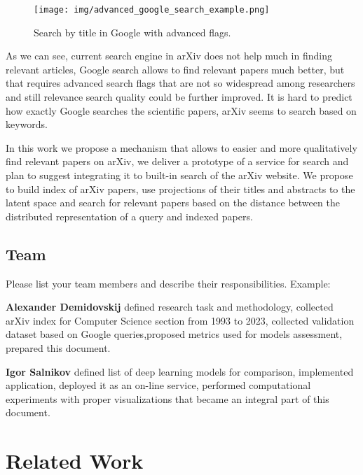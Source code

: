 \documentclass{article}
\begin{document}
    \begin{figure}[!tbh]
        \centering
        \texttt{[image: img/advanced\_google\_search\_example.png]}
        \caption{Search by title in Google with advanced flags.}
        \label{fig:advanced-google-search}
    \end{figure}
    
    As we can see, current search engine in arXiv does not help much in finding relevant articles, Google search allows to find relevant papers much better, but that requires advanced search flags that are not so widespread among researchers and still relevance search quality could be further improved. It is hard to predict how exactly Google searches the scientific papers, arXiv seems to search based on keywords.
    
    In this work we propose a mechanism that allows to easier and more qualitatively find relevant papers on arXiv, we deliver a prototype of a service for search and plan to suggest integrating it to built-in search of the arXiv website. We propose to build index of arXiv papers, use projections of their titles and abstracts to the latent space and search for relevant papers based on the distance between the distributed representation of a query and indexed papers.
    

    \subsection{Team}
        Please list your team members and describe their responsibilities. Example:

        \textbf{Alexander Demidovskij} defined research task and methodology, collected arXiv index for Computer Science section from 1993 to 2023, collected validation dataset based on Google queries,proposed metrics used for models assessment, prepared this document.

        \textbf{Igor Salnikov} defined list of deep learning models for comparison, implemented application, deployed it as an on-line service, performed computational experiments with proper visualizations that became an integral part of this document.

\section{Related Work}\label{sec:related}
\end{document}

